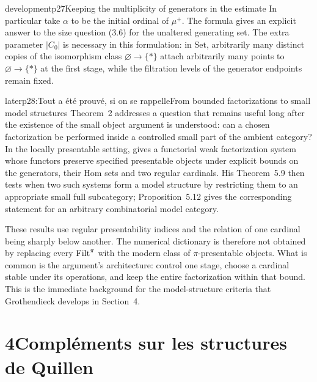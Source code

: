\begin{dcomment}{development}{p27}{Keeping the multiplicity of generators in the estimate}
In particular take $\alpha$ to be the initial ordinal of $\mu^+$. The formula gives an explicit answer to the size question (3.6) for the unaltered generating set. The extra parameter $|C_0|$ is necessary in this formulation: in $\mathrm{Set}$, arbitrarily many distinct copies of the isomorphism class $\varnothing\to\{*\}$ attach arbitrarily many points to $\varnothing\to\{*\}$ at the first stage, while the filtration levels of the generator endpoints remain fixed.
\end{dcomment}


\begin{dcomment}{later}{p28:Tout a été prouvé, si on se rappelle}{From bounded factorizations to small model structures}
Theorem~2 addresses a question that remains useful long after the existence of the small object argument is understood: can a chosen factorization be performed inside a controlled small part of the ambient category? In the locally presentable setting, \citet[Theorem 4.4]{Low2016Heart} gives a functorial weak factorization system whose functors preserve specified presentable objects under explicit bounds on the generators, their Hom sets and two regular cardinals. His Theorem~5.9 then tests when two such systems form a model structure by restricting them to an appropriate small full subcategory; Proposition~5.12 gives the corresponding statement for an arbitrary combinatorial model category.

These results use regular presentability indices and the relation of one cardinal being sharply below another. The numerical dictionary is therefore not obtained by replacing every $\mathrm{Filt}^\pi$ with the modern class of $\pi$-presentable objects. What is common is the argument's architecture: control one stage, choose a cardinal stable under its operations, and keep the entire factorization within that bound. This is the immediate background for the model-structure criteria that Grothendieck develops in Section~4.
\end{dcomment}


\section*{4\quad Compléments sur les structures de Quillen}


